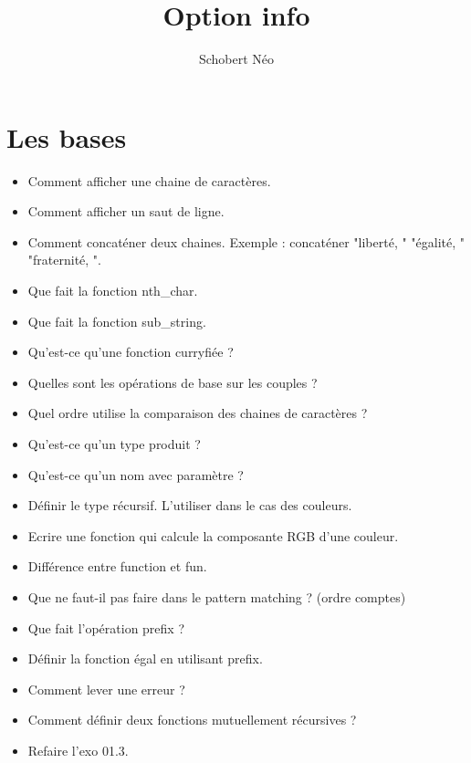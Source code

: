 \documentclass[a4paper, 11pt, hidelinks]{article}
\begin{document}
\newcommand{\grad}[1]{\vv{grad}#1}


\title{Option info}
\author{Schobert Néo}

\maketitle

\tableofcontents

\newpage 


\section{Les bases}



\begin{itemize}
    \item Comment afficher une chaine de caractères.
    \item Comment afficher un saut de ligne.
    \item Comment concaténer deux chaines. Exemple : concaténer "liberté, " "égalité, " "fraternité, ".
    \item Que fait la fonction nth\_char.
    \item Que fait la fonction sub\_string.
    \item Qu'est-ce qu'une fonction curryfiée ?
    \item Quelles sont les opérations de base sur les couples ?
    \item Quel ordre utilise la comparaison des chaines de caractères ? 
    \item Qu'est-ce qu'un type produit ? 
    \item Qu'est-ce qu'un nom avec paramètre ? 
    \item Définir le type récursif. L'utiliser dans le cas des couleurs.
    \item Ecrire une fonction qui calcule la composante RGB d'une couleur.
    \item Différence entre function et fun.
    \item Que ne faut-il pas faire dans le pattern matching ? (ordre comptes)
    \item Que fait l'opération prefix ?
    \item Définir la fonction égal en utilisant prefix.
    \item Comment lever une erreur ?
    \item Comment définir deux fonctions mutuellement récursives ?
    \item Refaire l'exo 01.3.
\end{itemize}
\end{document}
